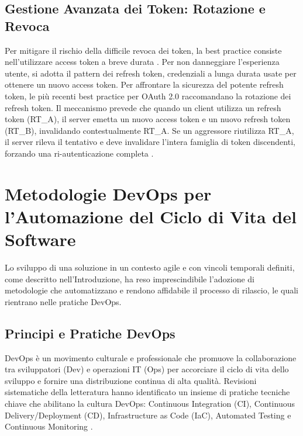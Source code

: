 \documentclass[12pt,a4paper,openright,twoside]{book}
\begin{document}
\subsection{Gestione Avanzata dei Token: Rotazione e Revoca}
Per mitigare il rischio della difficile revoca dei token, la best practice consiste nell'utilizzare access token a breve durata \cite{flanagan2024token}. Per non danneggiare l'esperienza utente, si adotta il pattern dei refresh token, credenziali a lunga durata usate per ottenere un nuovo access token. Per affrontare la sicurezza del potente refresh token, le più recenti best practice per OAuth 2.0 raccomandano la rotazione dei refresh token. Il meccanismo prevede che quando un client utilizza un refresh token (RT\_A), il server emetta un nuovo access token e un nuovo refresh token (RT\_B), invalidando contestualmente RT\_A. Se un aggressore riutilizza RT\_A, il server rileva il tentativo e deve invalidare l'intera famiglia di token discendenti, forzando una ri-autenticazione completa \cite{flanagan2024token}.

\section{Metodologie DevOps per l'Automazione del Ciclo di Vita del Software}

Lo sviluppo di una soluzione in un contesto agile e con vincoli temporali definiti, come descritto nell'Introduzione, ha reso imprescindibile l'adozione di metodologie che automatizzano e rendono affidabile il processo di rilascio, le quali rientrano nelle pratiche DevOps.

\subsection{Principi e Pratiche DevOps}
DevOps è un movimento culturale e professionale che promuove la collaborazione tra sviluppatori (Dev) e operazioni IT (Ops) per accorciare il ciclo di vita dello sviluppo e fornire una distribuzione continua di alta qualità. Revisioni sistematiche della letteratura hanno identificato un insieme di pratiche tecniche chiave che abilitano la cultura DevOps: Continuous Integration (CI), Continuous Delivery/Deployment (CD), Infrastructure as Code (IaC), Automated Testing e Continuous Monitoring \cite{teixeira2020systematic}.
\end{document}
